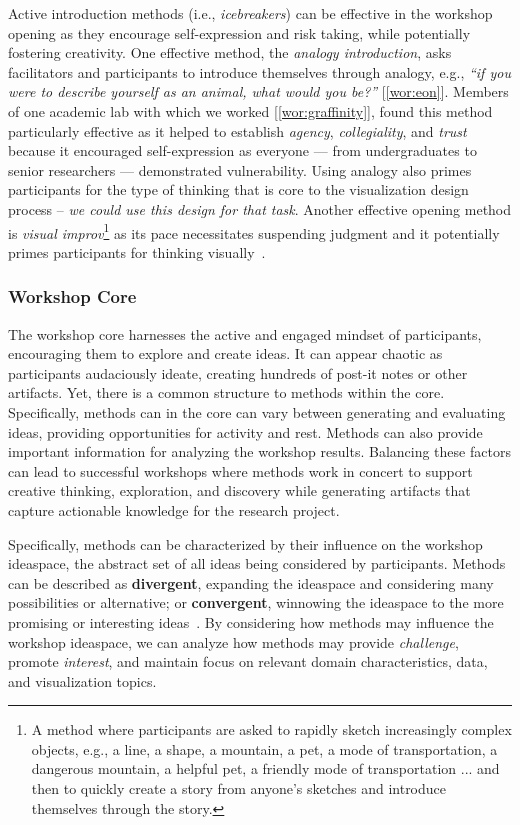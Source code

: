 Active introduction methods (i.e., \emph{icebreakers}) can be effective in the workshop opening as they encourage self-expression and risk taking, while potentially fostering creativity. One effective method, the \emph{analogy introduction}, asks facilitators and participants to introduce themselves through analogy, e.g., \emph{``if you were to describe yourself as an animal, what would you be?''} [\ref{wor:eon}]. Members of one academic lab with which we worked [\ref{wor:graffinity}], found this method particularly effective as it helped to establish {\it agency}, {\it collegiality}, and {\it trust} because it encouraged self-expression as everyone --- from undergraduates to senior researchers --- demonstrated vulnerability. Using analogy also primes participants for the type of thinking that is core to the visualization design process -- \emph{we could use this design for that task}. Another effective opening method is \emph{visual improv}\footnote{A method where participants are asked to rapidly sketch increasingly complex objects, e.g., a line, a shape, a mountain, a pet, a mode of transportation, a dangerous mountain, a helpful pet, a friendly mode of transportation ... and then to quickly create a story from anyone's sketches and introduce themselves through the story.} as its pace necessitates suspending judgment and it potentially primes participants for thinking visually~\cite{Rogers2017}. 

\subsubsection{Workshop Core}

The workshop core harnesses the active and engaged mindset of participants, encouraging them to explore and create ideas. It can appear chaotic as participants audaciously ideate, creating hundreds of post-it notes or other artifacts. Yet, there is a common structure to methods within the core. Specifically, methods can in the core can vary between generating and evaluating ideas, providing opportunities for activity and rest. Methods can also provide important information for analyzing the workshop results. Balancing these factors can lead to successful workshops where methods work in concert to support creative thinking, exploration, and discovery while generating artifacts that capture actionable knowledge for the research project.

Specifically, methods can  be characterized by their influence on the workshop ideaspace, the abstract set of all ideas being considered by participants. Methods can be described as {\bf divergent}, expanding the ideaspace and considering many possibilities or alternative; or {\bf convergent}, winnowing the ideaspace to the more promising or interesting ideas~\cite{Osborn1953}. By considering how methods may influence the workshop ideaspace, we can analyze how methods may provide {\it challenge}, promote {\it interest}, and maintain focus on relevant domain characteristics, data, and visualization topics. 

